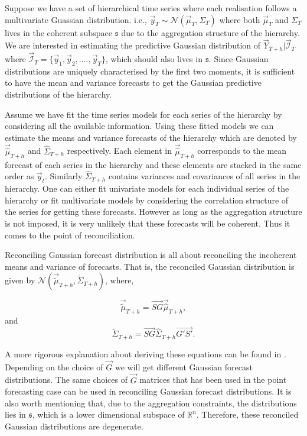 \documentclass[graybox]{svmult}
\begin{document}
Suppose we have a set of hierarchical time series where each realisation follows a multivariate Guassian distribution. i.e., $\vec{y}_T \sim \mathscr{N}(\vec{\mu}_T, \Sigma_T)$ where both $\vec{\mu}_T$ and $\Sigma_T$ lives in the coherent subspace $\mathfrak{s}$ due to the aggregation structure of the hierarchy. We are interested in estimating the predictive Gaussian distribution of $\vec{Y}_{T+h}| \vec{\mathscr{I}}_T$ where $\vec{\mathscr{I}}_T= \{\vec{y}_1,\vec{y}_2,\dots.,\vec{y}_T\}$, which should also lives in $\mathfrak{s}$. Since Gaussian distributions are uniquely characterised by the first two moments, it is sufficient to have the mean and variance forecasts to get the Gaussian predictive distributions of the hierarchy.

Assume we have fit the time series models for each series of the hierarchy by considering all the available information. Using these fitted models we can estimate the means and variance forecasts of the hierarchy which are denoted by $\vec{\hat{\mu}}_{T+h}$ and $\hat{\Sigma}_{T+h}$ respectively. Each element in $\vec{\hat{\mu}}_{T+h}$ corresponds to the mean forecast of each series in the hierarchy and these elements are stacked in the same order as $\vec{y}_t$. Similarly $\hat{\Sigma}_{T+h}$ contains variances and covariances of all series in the hierarchy. One can either fit univariate models for each individual series of the hierarchy or fit multivariate models by considering the correlation structure of the series for getting these forecasts. However as long as the aggregation structure is not imposed, it is very unlikely that these forecasts will be coherent. Thus it comes to the point of reconciliation.

Reconciling Gaussian forecast distribution is all about reconciling the incoherent means and variance of forecasts. That is, the reconciled Gaussian distribution is given by $\mathscr{N}(\vec{\tilde{\mu}}_{T+h}, \tilde{\Sigma}_{T+h})$, where,

\begin{equation}\label{eq:17}
\vec{\tilde{\mu}}_{T+h} = \vec{SG}\vec{\hat{\mu}}_{T+h},
\end{equation}
and
\begin{equation}\label{eq:18}
\tilde{\Sigma}_{T+h} = \vec{SG}\hat{\Sigma}_{T+h}\vec{G'S'}.
\end{equation}

A more rigorous explanation about deriving these equations can be found in \cite{Gamakumara2018}. Depending on the choice of $\vec{G}$ we will get different Gaussian forecast distributions. The same choices of $\vec{G}$ matrices that has been used in the point forecasting case can be used in reconciling Gaussian forecast distributions. It is also worth mentioning that, due to the aggregation constraints, the distributions lies in $\mathfrak{s}$, which is a lower dimensional subspace of $\mathbb{R}^n$. Therefore, these reconciled Gaussian distributions are degenerate.
\end{document}
